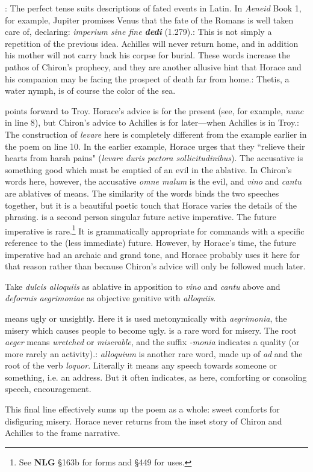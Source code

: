 
: The perfect tense suits descriptions of fated events in Latin.
In \textit{Aeneid} Book 1, for example, Jupiter promises Venus that the fate of
the Romans is well taken care of, declaring: \textit{imperium sine fine
\textbf{dedi}} (1.279).\indent{}: This is not simply
a repetition of the previous idea.  Achilles will never return home, and in
addition his mother will not carry back his corpse for burial.  These words
increase the pathos of Chiron's prophecy, and they are another allusive hint
that Horace and his companion may be facing the prospect of death far from
home.\indent{}: Thetis, a water nymph, is of course the color of the
sea.


 points forward to Troy.  Horace's advice is for the present (see,
for example, \textit{nunc} in line 8), but Chiron's advice to Achilles is for
later---when Achilles is in Troy.: The
construction of \textit{levare} here is completely different from the example
earlier in the poem on line 10.  In the earlier example, Horace urges that they
``relieve their hearts from harsh pains" (\textit{levare duris pectora
sollicitudinibus}). The accusative is something good which must be emptied of
an evil in the ablative.  In Chiron's words here, however, the accusative
\textit{omne malum} is the evil, and \textit{vino} and \textit{cantu} are
ablatives of means.  The similarity of the words binds the two speeches
together, but it is a beautiful poetic touch that Horace varies the details of
the phrasing.\indent{} is a second person singular future active
imperative.  The future imperative is rare.\footnote{See \textbf{NLG} \S 163b
for forms and \S 449 for uses.}  It is grammatically appropriate for commands
with a specific reference to the (less immediate) future.  However, by Horace's
time, the future imperative had an archaic and grand tone, and Horace probably
uses it here for that reason rather than because Chiron's advice will only be
followed much later.


Take \textit{dulcis alloquiis} as ablative in apposition to \textit{vino} and
\textit{cantu} above and \textit{deformis aegrimoniae} as objective genitive
with \textit{alloquiis}.


 means ugly or unsightly.  Here it is used metonymically with
\textit{aegrimonia}, the misery which causes people to become
ugly.\indent{} is a rare word for misery.  The root
\textit{aeger} means \textit{wretched} or \textit{miserable}, and the suffix
\textit{-monia} indicates a quality (or more rarely an
activity).\indent{}: \textit{alloquium} is another rare word, made
up of \textit{ad} and the root of the verb \textit{loquor}.  Literally it means
any speech towards someone or something, i.e. an address.  But it often
indicates, as here, comforting or consoling speech, encouragement.

This final line effectively sums up the poem as a whole: sweet comforts for
disfiguring misery.  Horace never returns from the inset story of Chiron and
Achilles to the frame narrative.

